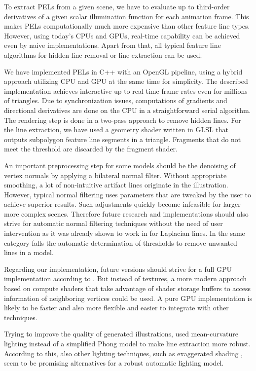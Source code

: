 \documentclass[9pt,fleqn,twoside,twocolumn]{stdglobal}
\begin{document}
  To extract PELs from a given scene, we have to evaluate up to third-order derivatives of a given scalar illumination function for each animation frame.
  This makes PELs computationally much more expensive than other feature line types.
  However, using today's CPUs and GPUs, real-time capability can be achieved even by naive implementations.
  Apart from that, all typical feature line algorithms for hidden line removal or line extraction can be used.

  We have implemented PELs in C++ with an OpenGL pipeline, using a hybrid approach utilizing CPU and GPU at the same time for simplicity.
  The described implementation achieves interactive up to real-time frame rates even for millions of triangles.
  Due to synchronization issues, computations of gradients and directional derivatives are done on the CPU in a straightforward serial algorithm.
  The rendering step is done in a two-pass approach to remove hidden lines.
  For the line extraction, we have used a geometry shader written in GLSL that outputs subpolygon feature line segments in a triangle.
  Fragments that do not meet the threshold are discarded by the fragment shader.

  An important preprocessing step for some models should be the denoising of vertex normals by applying a bilateral normal filter.
  Without appropriate smoothing, a lot of non-intuitive artifact lines originate in the illustration.
  However, typical normal filtering uses parameters that are tweaked by the user to achieve superior results.
  Such adjustments quickly become infeasible for larger more complex scenes.
  Therefore future research and implementations should also strive for automatic normal filtering techniques without the need of user intervention as it was already shown to work in \textcite{zhang2011} for Laplacian lines.
  In the same category falls the automatic determination of thresholds to remove unwanted lines in a model.

  Regarding our implementation, future versions should strive for a full GPU implementation according to \textcite{zhang2010}.
  But instead of textures, a more modern approach based on compute shaders that take advantage of shader storage buffers to access information of neighboring vertices could be used.
  A pure GPU implementation is likely to be faster and also more flexible and easier to integrate with other techniques.

  \newpage

  Trying to improve the quality of generated illustrations, \citeauthor{zhang2010} used mean-curvature lighting \autocite{kindlmann2003,kolomenkin2008} instead of a simplified Phong model to make line extraction more robust.
  According to this, also other lighting techniques, such as exaggerated shading \autocite{rusinkiewicz2006}, seem to be promising alternatives for a robust automatic lighting model.
\end{document}
